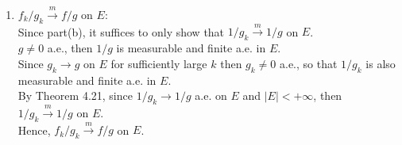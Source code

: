 \documentclass[a4paper,11pt]{article}
\begin{document}
\begin{enumerate}
\begin{enumerate}
\item $f_k / g_k \overset{m}{\to} f/g$ on $E$:\\

Since part(b), it suffices to only show that $1 / g_k \overset{m}{\to} 1 / g$ on $E$.\\
$g \neq 0$ a.e., then $1/g$ is measurable and finite a.e. in $E$.\\
Since $g_k \to g$ on $E$ for sufficiently large $k$ then $g_k \neq 0$ a.e., so that $1/g_k$ is also measurable and finite a.e. in $E$.\\
By Theorem 4.21, since $1 / g_k \to 1 / g$ a.e. on $E$ and $|E| < +\infty$, then $1 / g_k \overset{m}{\to} 1 / g$ on $E$.\\
Hence, $f_k/g_k \overset{m}{\to} f/g$ on $E$.\\

\end{enumerate}





\end{enumerate}
\end{document}
